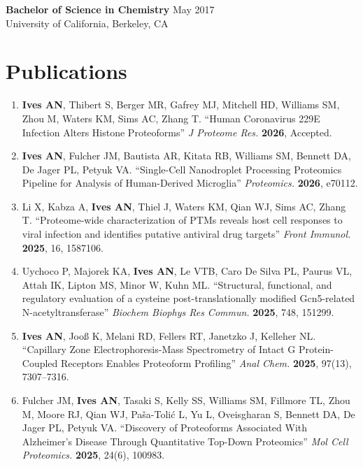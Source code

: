 \documentclass[10pt, letterpaper]{article}
\begin{document}
\textbf{Bachelor of Science in Chemistry} \hfill May 2017 \\
University of California, Berkeley, CA

\section{Publications}

\begin{enumerate}[leftmargin=*, label=\arabic*., topsep=2pt, itemsep=3pt]

  \item \textbf{Ives AN}, Thibert S, Berger MR, Gafrey MJ, Mitchell HD, Williams SM, Zhou M, Waters
  KM, Sims AC, Zhang T. ``Human Coronavirus 229E Infection Alters Histone Proteoforms''
  \textit{J Proteome Res.} \textbf{2026}, Accepted.

  \item \textbf{Ives AN}, Fulcher JM, Bautista AR, Kitata RB, Williams SM, Bennett DA, De Jager PL,
  Petyuk VA. ``Single-Cell Nanodroplet Processing Proteomics Pipeline for Analysis of Human-Derived
  Microglia'' \textit{Proteomics.} \textbf{2026}, e70112.

  \item Li X, Kabza A, \textbf{Ives AN}, Thiel J, Waters KM, Qian WJ, Sims AC, Zhang T.
  ``Proteome-wide characterization of PTMs reveals host cell responses to viral infection and identifies
  putative antiviral drug targets'' \textit{Front Immunol.} \textbf{2025}, 16, 1587106.

  \item Uychoco P, Majorek KA, \textbf{Ives AN}, Le VTB, Caro De Silva PL, Paurus VL, Attah IK,
  Lipton MS, Minor W, Kuhn ML. ``Structural, functional, and regulatory evaluation of a cysteine
  post-translationally modified Gcn5-related N-acetyltransferase'' \textit{Biochem Biophys Res Commun.}
  \textbf{2025}, 748, 151299.

  \item \textbf{Ives AN}, Joo\ss{} K, Melani RD, Fellers RT, Janetzko J, Kelleher NL. ``Capillary Zone
  Electrophoresis-Mass Spectrometry of Intact G Protein-Coupled Receptors Enables Proteoform Profiling''
  \textit{Anal Chem.} \textbf{2025}, 97(13), 7307--7316.

  \item Fulcher JM, \textbf{Ives AN}, Tasaki S, Kelly SS, Williams SM, Fillmore TL, Zhou M, Moore RJ,
  Qian WJ, Pa\v{s}a-Toli\'{c} L, Yu L, Oveisgharan S, Bennett DA, De Jager PL, Petyuk VA.
  ``Discovery of Proteoforms Associated With Alzheimer's Disease Through Quantitative Top-Down
  Proteomics'' \textit{Mol Cell Proteomics.} \textbf{2025}, 24(6), 100983.


\end{enumerate}
\end{document}
